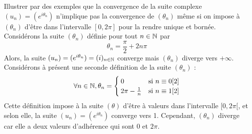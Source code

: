 \documentclass{article}
\begin{document}
\begin{question_kholle}{Illustrer par des exemples que la convergence
		de la suite complexe $(u_{n})=(e^{i \theta_{n}})$ n’implique pas la
		convergence de $(\theta_{n})$ même si on impose à $(\theta_{n})$
		d’être dans l’intervalle $[0,2 \pi]$ pour la rendre unique et bornée.}
	Considérons la suite $(\theta_{n})$ définie pour tout $n\in\mathbb N$ par
	\[
		\theta_{n}=\frac{\pi}{2}+2n \pi
	\]
	Alors, la suite $(u_{n})=(e^{i \theta_{n}}) = (i)_{n\in\mathbb N}$
	converge mais $(\theta_{n})$ diverge vers $+\infty$.\\
	Considérons à présent une seconde définition de la suite $(\theta_{n})$ :
	\[
		\forall n\in\mathbb N, \theta_{n}=
		\begin{cases}
			0                   & \text{si } n\equiv 0[2] \\
			2 \pi - \frac{1}{n} & \text{si } n\equiv 1[2]
		\end{cases}
	\]
	Cette définition impose à la suite $(\theta)$ d’être à valeurs dans
	l’intervalle $[0,2 \pi[$, et selon elle, la suite $(u_{n})=(e^{i
				\theta_{n}})$ converge vers 1. Cependant, $(\theta_{n})$ diverge
	car elle a deux valeurs d’adhérence qui sont $0$ et $2 \pi$.

\end{question_kholle}
\end{document}
